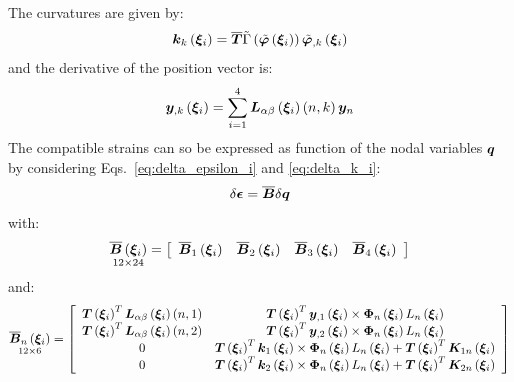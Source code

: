 The curvatures are given by:
\begin{equation}
\T{k}_{k} \valxii  =
\overline{\T{T}} \tilde{\Gamma} \plbr{ \tilde{\T{\varphi}} \valxii } \tilde{ \T{\varphi} }_{,k} \valxii
\end{equation}
and the derivative of the position vector is:
\begin{equation}
\T{y}_{,k} \valxii  =
\sum_{i=1}^{4} \T{L}_{\alpha \beta} \valxii \plbr{n,k} \T{y}_n
\end{equation}
The compatible strains can so be expressed as function of the nodal variables $\T{q}$ by considering Eqs.~\ref{eq:delta_epsilon_i} and \ref{eq:delta_k_i}:
\begin{equation}
\delta \T{\epsilon} = \overline{\T{B}} \delta{\T{q}}
\end{equation}
with:
\begin{equation}
\underset{ 12 \times 24 }{\overline{\T{B}} \valxii} =
\sqbr{ \matr{ c c c c  }{
\overline{\T{B}}_1 \valxii & \overline{\T{B}}_2 \valxii & \overline{\T{B}}_3 \valxii & \overline{\T{B}}_4 \valxii
}}
\label{eq:B_overline}
\end{equation}
and:
\begin{equation}
\underset{ 12 \times 6 }{\overline{\T{B}}_n \valxii} =
\sqbr{ \matr{ c c  }{
\T{T} \valxii^T \T{L}_{\alpha \beta} \valxii \plbr{n,1} & \T{T}\valxii^T \T{y}_{,1} \valxii \times \T{\Phi}_{n} \valxii L_{n} \valxii \\
\T{T} \valxii^T \T{L}_{\alpha \beta} \valxii \plbr{n,2} & \T{T}\valxii^T \T{y}_{,2} \valxii \times \T{\Phi}_{n} \valxii L_{n} \valxii \\
0 & \T{T}\valxii^T \T{k}_{1} \valxii \times \T{\Phi}_{n} \valxii L_{n} \valxii + \T{T} \valxii^T \T{K}_{1n} \valxii \\
0 & \T{T}\valxii^T \T{k}_{2} \valxii \times \T{\Phi}_{n} \valxii L_{n} \valxii + \T{T} \valxii^T \T{K}_{2n} \valxii
}}
\end{equation}
